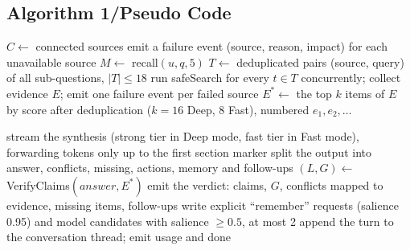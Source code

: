 \documentclass[oneside,a4paper,12pt]{report}
\begin{document}
  \subsection{Algorithm 1/Pseudo Code}
\begin{algorithm}[H]
\caption{Bounded agent run (runAgent)}
\label{alg:run}
$C \leftarrow$ connected sources\; emit a failure event (source, reason, impact) for each unavailable source\;
$M \leftarrow$ recall$(u, q, 5)$ 
$T \leftarrow$ deduplicated pairs (source, query) of all sub-questions, $|T| \le 18$\;
run safeSearch for every $t \in T$ concurrently; collect evidence $E$; emit one failure event per failed source\;
$E^{*} \leftarrow$ the top $k$ items of $E$ by score after deduplication ($k = 16$ Deep, $8$ Fast), numbered $e_1, e_2, \ldots$\;
\end{algorithm}
\addtocounter{algocf}{-1}%
\begin{algorithm}[H]
\caption{Bounded agent run (runAgent), continued: synthesis, verification and proposals}
stream the synthesis (strong tier in Deep mode, fast tier in Fast mode), forwarding tokens only up to the first section marker\;
split the output into answer, conflicts, missing, actions, memory and follow-ups\;
$(L, G) \leftarrow$ VerifyClaims$(\mathit{answer}, E^{*})$\;
emit the verdict: claims, $G$, conflicts mapped to evidence, missing items, follow-ups\;
write explicit ``remember'' requests (salience 0.95) and model candidates with salience $\ge 0.5$, at most 2\;
append the turn to the conversation thread; emit usage and done\;
\end{algorithm}
\end{document}
